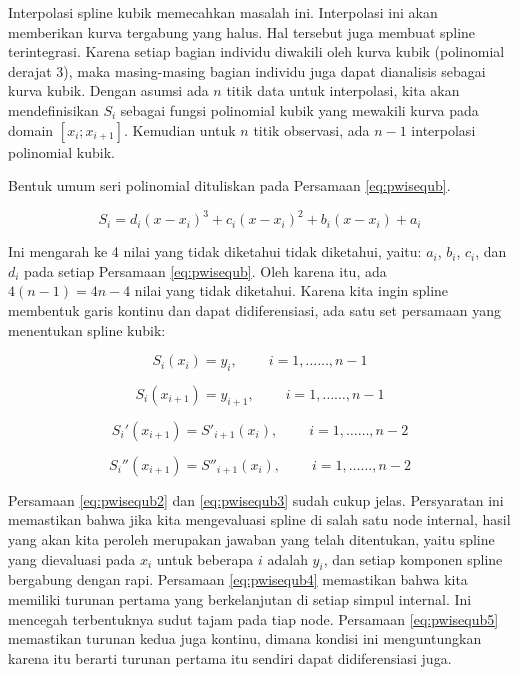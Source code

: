 \documentclass[
]{book}
\theoremstyle{definition}
\theoremstyle{definition}
\theoremstyle{definition}
\theoremstyle{definition}
\theoremstyle{remark}
\begin{document}
Interpolasi spline kubik memecahkan masalah ini. Interpolasi ini akan memberikan kurva tergabung yang halus. Hal tersebut juga membuat spline terintegrasi. Karena setiap bagian individu diwakili oleh kurva kubik (polinomial derajat 3), maka masing-masing bagian individu juga dapat dianalisis sebagai kurva kubik. Dengan asumsi ada \(n\) titik data untuk interpolasi, kita akan mendefinisikan \(S_i\) sebagai fungsi polinomial kubik yang mewakili kurva pada domain \(\left[x_i; x_{i + 1}\right]\). Kemudian untuk \(n\) titik observasi, ada \(n - 1\) interpolasi polinomial kubik.

Bentuk umum seri polinomial dituliskan pada Persamaan \eqref{eq:pwisequb}.

\begin{equation}
S_i=d_i\left(x-x_i\right)^3+c_i\left(x-x_i\right)^2+b_i\left(x-x_i\right)+a_i
  \label{eq:pwisequb}
\end{equation}

Ini mengarah ke 4 nilai yang tidak diketahui tidak diketahui, yaitu: \(a_i\), \(b_i\), \(c_i\), dan \(d_i\) pada setiap Persamaan \eqref{eq:pwisequb}. Oleh karena itu, ada \(4 \left(n - 1\right) = 4n - 4\) nilai yang tidak diketahui. Karena kita ingin spline membentuk garis kontinu dan dapat didiferensiasi, ada satu set persamaan yang menentukan spline kubik:

\begin{equation}
S_i\left(x_i\right)=y_i,\ \ \ \ \ \ \ \ \ \ i=1,\dots\dots,n-1
  \label{eq:pwisequb2}
\end{equation}

\begin{equation}
S_i\left(x_{i+1}\right)=y_{i+1},\ \ \ \ \ \ \ \ \ \ i=1,\dots\dots,n-1
  \label{eq:pwisequb3}
\end{equation}

\begin{equation}
S_i'\left(x_{i+1}\right)=S'_{i+1}\left(x_i\right),\ \ \ \ \ \ \ \ \ \ i=1,\dots\dots,n-2
  \label{eq:pwisequb4}
\end{equation}

\begin{equation}
S_i''\left(x_{i+1}\right)=S''_{i+1}\left(x_i\right),\ \ \ \ \ \ \ \ \ \ i=1,\dots\dots,n-2
  \label{eq:pwisequb5}
\end{equation}

Persamaan \eqref{eq:pwisequb2} dan \eqref{eq:pwisequb3} sudah cukup jelas. Persyaratan ini memastikan bahwa jika kita mengevaluasi spline di salah satu node internal, hasil yang akan kita peroleh merupakan jawaban yang telah ditentukan, yaitu spline yang dievaluasi pada \(x_i\) untuk beberapa \(i\) adalah \(y_i\), dan setiap komponen spline bergabung dengan rapi. Persamaan \eqref{eq:pwisequb4} memastikan bahwa kita memiliki turunan pertama yang berkelanjutan di setiap simpul internal. Ini mencegah terbentuknya sudut tajam pada tiap node. Persamaan \eqref{eq:pwisequb5} memastikan turunan kedua juga kontinu, dimana kondisi ini menguntungkan karena itu berarti turunan pertama itu sendiri dapat didiferensiasi juga.
\end{document}
